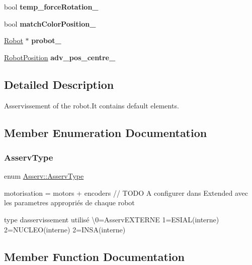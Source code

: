 \begin{DoxyCompactItemize}
bool {\bfseries temp\+\_\+force\+Rotation\+\_\+}
\item 
\mbox{\label{classAsserv_a51b73c5451bf94a72a89a85b1ec27910}} 
bool {\bfseries match\+Color\+Position\+\_\+}
\item 
\mbox{\label{classAsserv_a9239da2aed5ae3a77395b8c8a72a5d73}} 
\hyperlink{classRobot}{Robot} $\ast$ {\bfseries probot\+\_\+}
\item 
\mbox{\label{classAsserv_af3daf770333e38e3a4191de99fd85ddc}} 
\hyperlink{structRobotPosition}{Robot\+Position} {\bfseries adv\+\_\+pos\+\_\+centre\+\_\+}
\end{DoxyCompactItemize}


\subsection{Detailed Description}
Asservissement of the robot.\+It contains default elements. 

\subsection{Member Enumeration Documentation}
\mbox{\label{classAsserv_ad1cfde496b9ab7fb2cf6fa0d2cf6d8fc}} 
\subsubsection{\texorpdfstring{Asserv\+Type}{AsservType}}
{\footnotesize\ttfamily enum \hyperlink{classAsserv_ad1cfde496b9ab7fb2cf6fa0d2cf6d8fc}{Asserv\+::\+Asserv\+Type}\hspace{0.3cm}{\ttfamily [protected]}}



motorisation = motors + encoders // T\+O\+DO A configurer dans Extended avec les parametres appropriés de chaque robot 

type d\textquotesingle{}asservissement utilisé \textbackslash{}0=Asserv\+E\+X\+T\+E\+R\+NE 1=E\+S\+I\+A\+L(interne) 2=N\+U\+C\+L\+E\+O(interne) 2=I\+N\+S\+A(interne) 

\subsection{Member Function Documentation}
\mbox{\label{classAsserv_a1677fd20a9cb16f78c609951e073550e}} 
